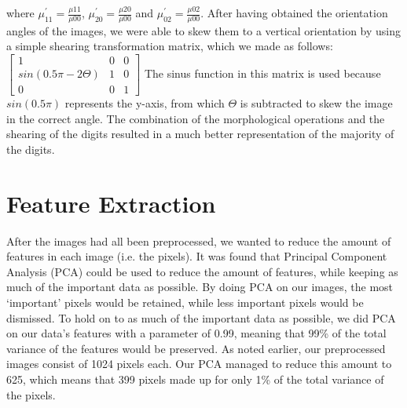 \documentclass[11pt,twoside,a4paper]{article}
\begin{document}
where $\mu_{11}^{'} = \frac{\mu{11}}{\mu{00}}$, $\mu_{20}^{'} = \frac{\mu{20}}{\mu{00}}$ and $\mu_{02}^{'} = \frac{\mu{02}}{\mu{00}}$.
\newline\newline
After having obtained the orientation angles of the images, we were able to skew them to a vertical orientation by using a simple shearing transformation matrix, which we made as follows:
\newline\newline
$\begin{bmatrix}
       1                       & 0           & 0           \\[0.3em]
       sin(0.5\pi - 2\Theta)   & 1           & 0		   \\[0.3em]
       0                       & 0           & 1
\end{bmatrix}$
\newline\newline\newline
The sinus function in this matrix is used because $sin(0.5\pi)$ represents the y-axis, from which $\Theta$ is subtracted to skew the image in the correct angle.
\newline\newline
The combination of the morphological operations and the shearing of the digits resulted in a much better representation of the majority of the digits.\\


\section{Feature Extraction}
After the images had all been preprocessed, we wanted to reduce the amount of features in each image (i.e. the pixels). It was found that Principal Component Analysis (PCA) could be used to reduce the amount of features, while keeping as much of the important data as possible. By doing PCA on our images, the most `important' pixels would be retained, while less important pixels would be dismissed.\newline\newline
To hold on to as much of the important data as possible, we did PCA on our data's features with a parameter of 0.99, meaning that 99\% of the total variance of the features would be preserved. As noted earlier, our preprocessed images consist of 1024 pixels each. Our PCA managed to reduce this amount to 625, which means that 399 pixels made up for only 1\% of the total variance of the pixels.
\end{document}
